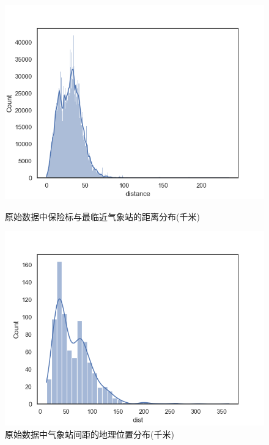 \begin{figure}[H]
    \begin{minipage}{0.48\linewidth}
        \centering
        \includegraphics[width=\textwidth]{lib/img/distance.png}
        \caption{原始数据中保险标与最临近气象站的距离分布(千米)}
        \label{fig:distance}
    \end{minipage}
    \begin{minipage}{0.48\linewidth}
        \centering
        \includegraphics[width=\textwidth]{lib/img/locations_distance.png}
        \caption{原始数据中气象站间距的地理位置分布(千米)}
        \label{fig:locations}
    \end{minipage}
\end{figure}


